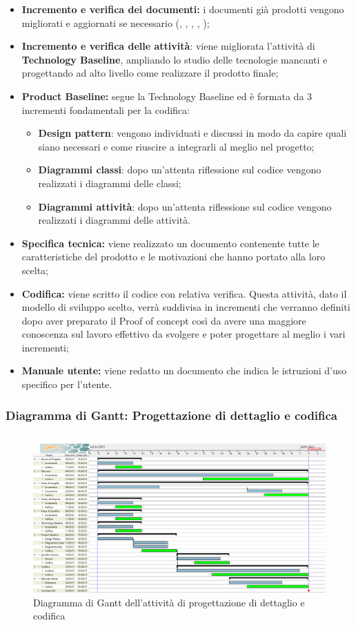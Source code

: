 \begin{itemize}
    \item \textbf{Incremento e verifica dei documenti:} i documenti già prodotti vengono migliorati e aggiornati se necessario ({\NdP}, {\PdP}, {\Glossario}, {\PdQ}, {\AdR});
    \item \textbf{Incremento e verifica delle attività}: viene migliorata l'attività di \textbf{Technology Baseline}, ampliando lo studio delle tecnologie mancanti e progettando ad alto livello come realizzare il prodotto finale;
    \item \textbf{Product Baseline:} segue la Technology Baseline ed è formata da 3 incrementi fondamentali per la codifica:
        \begin{itemize}
            \item \textbf{Design pattern}: vengono individuati e discussi in modo da capire quali siano necessari e come riuscire a integrarli al meglio nel progetto;
            \item \textbf{Diagrammi classi}: dopo un'attenta riflessione sul codice vengono realizzati i diagrammi delle classi;
            \item \textbf{Diagrammi attività}: dopo un'attenta riflessione sul codice vengono realizzati i diagrammi delle attività. 
        \end{itemize} 
    \item \textbf{Specifica tecnica:} viene realizzato un documento contenente tutte le caratteristiche del prodotto e le motivazioni che hanno portato alla loro scelta;
    \item \textbf{Codifica:} viene scritto il codice con relativa verifica. Questa attività, dato il modello di sviluppo scelto, verrà suddivisa in incrementi che verranno definiti dopo aver preparato il Proof of concept così da avere una maggiore conoscenza sul lavoro effettivo da svolgere e poter progettare al meglio i vari incrementi;
    \item \textbf{Manuale utente:} viene redatto un documento che indica le istruzioni d'uso specifico per l'utente.
\end{itemize}
\newpage
\subsubsection{Diagramma di Gantt: Progettazione di dettaglio e codifica}
\begin{figure}[ht]
    \centering
    \includegraphics[width=\textwidth]{Immagini/GanttProgettazioneDiDettaglioECodifica}
    \caption{Diagramma di Gantt dell'attività di progettazione di dettaglio e codifica}
\end{figure}